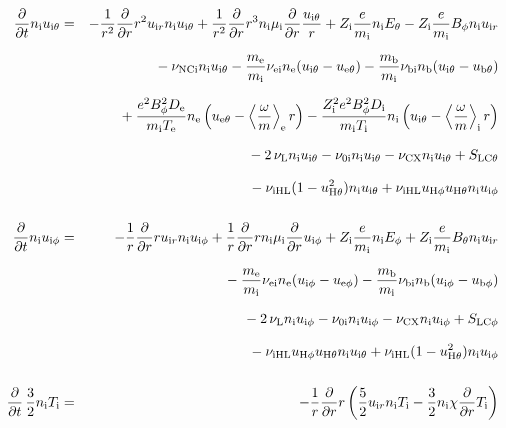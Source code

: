 \documentclass[11pt]{article}
\def\r#1{{\rm#1}}
\def\ddt{\frac{\partial}{\partial t}}
\def\ddr{\frac{\partial}{\partial r}}
\def\ave#1{\left\langle#1\right\rangle}
\def\me{m_\r{e}}
\def\mi{m_\r{i}}
\def\mb{m_\r{b}}
\def\mue{\mu_\r{e}}
\def\mui{\mu_\r{i}}
\def\De{D_\r{e}}
\def\Di{D_\r{i}}
\def\ne{n_\r{e}}
\def\ni{n_\r{i}}
\def\nb{n_\r{b}}
\def\uir{u_{\r{i}r}}
\def\ueth{u_{\r{e}\theta}}
\def\uith{u_{\r{i}\theta}}
\def\ubth{u_{\r{b}\theta}}
\def\ueph{u_{\r{e}\phi}}
\def\uiph{u_{\r{i}\phi}}
\def\ubph{u_{\r{b}\phi}}
\def\Eth{E_\theta}
\def\Eph{E_\phi}
\def\Bth{B_\theta}
\def\Bph{B_\phi}
\def\Te{T_\r{e}}
\def\Ti{T_\r{i}}
\def\Zi{Z_\r{i}}
\def\nuNCi{\nu_\r{NCi}}
\def\nuei{\nu_\r{ei}}
\def\nubi{\nu_\r{bi}}
\def\nuni{\nu_\r{0i}}
\def\nuL{\nu_\r{L}}
\def\nuCX{\nu_\r{CX}}
\newcommand{\Frac}[2]{%
  {\displaystyle {\displaystyle #1\over \displaystyle #2}}%
}
\newcommand{\rdprd}[2]{\Frac{\partial #1}{\partial #2}}
\newcommand{\aveaveB}[1]{\left< \!\! \left< #1 \right> \!\! \right>}
\begin{document}
\begin{eqnarray}
%
%
  \ddt \ni \uith &=&
%
  - \frac{1}{r^2} \ddr r^2 \uir \ni \uith
%
  + \frac{1}{r^2} \ddr r^3 \ni \mui \ddr \frac{\uith}{r}
%
  + \Zi \frac{e}{\mi} \ni \Eth
%
  - \Zi \frac{e}{\mi} \Bph \ni \uir
\nonumber\\[2.5mm]&&{}
%
  - \nuNCi \ni \uith
%
  - \frac{\me}{\mi} \nuei \ne (\uith - \ueth)
%
  - \frac{\mb}{\mi} \nu_\r{bi} \nb (\uith - \ubth)
\nonumber\\[2.5mm]&&{}
%
  + \frac{e^2 \Bph^2 \De}{\mi\Te}\ne
    \left(\ueth - \ave{\frac{\omega}{m}}_\r{e} r \right)
%
  - \frac{\Zi^2 e^2 \Bph^2 \Di}{\mi\Ti}\ni
    \left(\uith - \ave{\frac{\omega}{m}}_\r{i} r \right)
%
\nonumber\\[2.5mm]&&{}
%
  - 2\, \nuL \ni \uith
%
  - \nuni \ni \uith
%
  - \nuCX \ni \uith
%
  + S_\r{LC\theta}
\nonumber\\[2.5mm]&&{}
%
  - \nu_\r{iHL} (1 - u_{\r{H}\theta}^2) \ni \uith
%
  + \nu_\r{iHL} u_{\r{H}\phi} u_{\r{H}\theta} \ni \uiph
\\[5mm]
%
%
  \ddt \ni \uiph &=&
%
  - \frac{1}{r} \ddr r \uir \ni \uiph
%
  + \frac{1}{r} \ddr r \ni \mui \ddr \uiph
%
  + \Zi \frac{e}{\mi} \ni \Eph
%
  + \Zi \frac{e}{\mi} \Bth \ni \uir 
\nonumber\\[2.5mm]&&{}
%
  - \frac{\me}{\mi} \nuei \ne (\uiph - \ueph)
%
  - \frac{\mb}{\mi} \nubi \nb (\uiph - \ubph)
\nonumber\\[2.5mm]&&{}
%
  - 2\, \nuL \ni \uiph
%
  - \nuni \ni \uiph
%
  - \nuCX \ni \uiph
%
  + S_\r{LC\phi}
\nonumber\\[2.5mm]&&{}
%
  - \nu_\r{iHL} u_{\r{H}\phi} u_{\r{H}\theta} \ni \uith
%
  + \nu_\r{iHL} (1 - u_{\r{H}\theta}^2) \ni \uiph
\\[5mm]
%
%
  \ddt \, \frac{3}{2} \ni \Ti &=&
%
 - \frac{1}{r} \ddr r
   \left( \frac{5}{2} \uir \ni \Ti - \frac{3}{2} \ni \chi \ddr \Ti \right)

\end{eqnarray}
\end{document}
